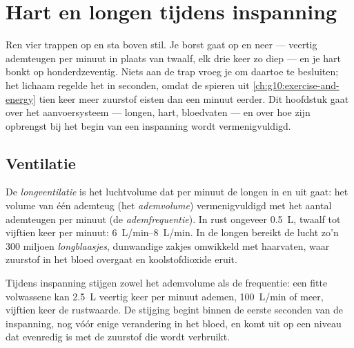 \chapter{Hart en longen tijdens inspanning}\label{ch:g10:heart-lungs-effort}

Ren vier trappen op en sta boven stil. Je borst gaat op en neer ---
veertig ademteugen per minuut in plaats van twaalf, elk drie keer zo diep
--- en je hart bonkt op honderdzeventig. Niets aan de trap vroeg je om
daartoe te besluiten; het lichaam regelde het in seconden, omdat de
spieren uit \cref{ch:g10:exercise-and-energy} tien keer meer zuurstof
eisten dan een minuut eerder. Dit hoofdstuk gaat over het
aanvoersysteem --- longen, hart, bloedvaten --- en over hoe zijn
opbrengst bij het begin van een inspanning wordt vermenigvuldigd.

\section{Ventilatie}

\begin{definition}[Ventilatie]\label{def:g10:heart-lungs-effort:ventilation}
De \emph{longventilatie} is het luchtvolume dat per
minuut de longen in en uit gaat: het volume van één ademteug (het
\emph{ademvolume}) vermenigvuldigd met het aantal ademteugen per minuut
(de \emph{ademfrequentie}). In rust ongeveer \qty{0.5}{L}, twaalf tot
vijftien keer per minuut: \qtyrange{6}{8}{L/min}. In de longen bereikt de
lucht zo'n 300 miljoen \emph{longblaasjes},
dunwandige zakjes omwikkeld met haarvaten, waar zuurstof in het bloed
overgaat en koolstofdioxide eruit.
\end{definition}

\begin{proposition}\label{prop:g10:heart-lungs-effort:vent-exercise}
Tijdens inspanning stijgen zowel het ademvolume als de frequentie: een
fitte volwassene kan \qty{2.5}{L} veertig keer per minuut ademen,
\qty{100}{L/min} of meer, vijftien keer de rustwaarde. De stijging begint
binnen de eerste seconden van de inspanning, nog vóór enige verandering
in het bloed, en komt uit op een niveau dat evenredig is met de zuurstof
die wordt verbruikt.
\end{proposition}
\admitted

